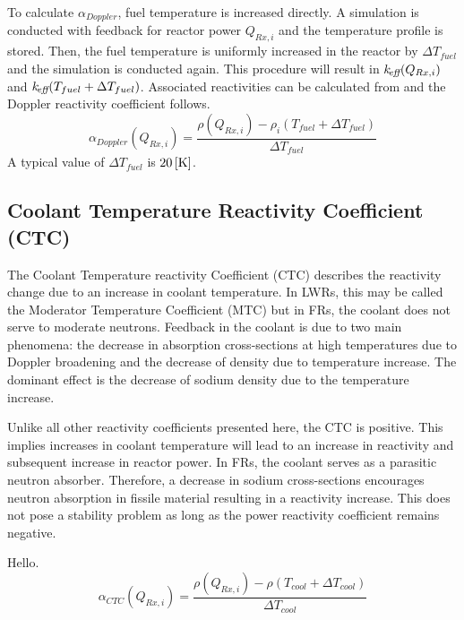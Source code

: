     To calculate $\alpha_{Doppler}$, fuel temperature is increased directly. A
    simulation is conducted with feedback for reactor power $Q_{Rx,i}$ and the
    temperature profile is stored. Then, the fuel temperature is uniformly 
    increased in the reactor by $\Delta T_{fuel}$ and the simulation is
    conducted again. This procedure will result in $k_{\!\mbox{\scriptsize \em eff}}(Q_{Rx,i})$ and
    ${k_{\!\mbox{\scriptsize \em eff}}(T_{fuel} + \Delta T_{fuel})}$. Associated reactivities can be
    calculated from  and the Doppler reactivity coefficient
    follows.
    \begin{equation}
      \label{eq:doppler_reactivity_coefficient}
      \alpha_{Doppler}(Q_{Rx,i}) = \frac{\rho(Q_{Rx,i}) - \rho_i(T_{fuel} +
        \Delta T_{fuel})} {\Delta T_{fuel}}
    \end{equation}
    A typical value of $\Delta T_{fuel}$ is $20\left[\text{{K}}\right]$.

  \subsection{Coolant Temperature Reactivity Coefficient (CTC)}
  \label{sec:coolant_temperature_reactivity_coefficient}
    The Coolant Temperature reactivity Coefficient (CTC) describes the
    reactivity change due to an increase in coolant temperature. In LWRs, this
    may be called the Moderator Temperature Coefficient (MTC) but in FRs, the
    coolant does not serve to moderate neutrons. Feedback in the coolant is due
    to two main phenomena: the decrease in absorption cross-sections at high
    temperatures due to Doppler broadening and the decrease of density due to
    temperature increase. The dominant effect is the decrease of sodium density
    due to the temperature increase.

    Unlike all other reactivity coefficients presented here, the CTC is
    positive. This implies increases in coolant temperature will lead to an
    increase in reactivity and subsequent increase in reactor power. In FRs, the
    coolant serves as a parasitic neutron absorber. Therefore, a decrease in
    sodium cross-sections encourages neutron absorption in fissile material
    resulting in a reactivity increase. This does not pose a stability problem
    as long as the power reactivity coefficient remains negative.

    Hello.
    \begin{equation}
      \label{eq:coolant_temperature_reactivity_coefficient}
      \alpha_{CTC}(Q_{Rx,i}) = \frac{\rho(Q_{Rx,i}) - \rho(T_{cool} + 
        \Delta T_{cool})} {\Delta T_{cool}}
    \end{equation}

